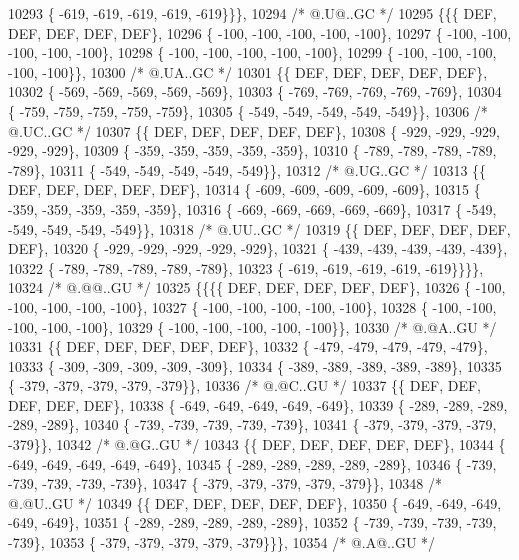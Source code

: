 \begin{DoxyCode}
10293 \{ -619, -619, -619, -619, -619\}\}\},
10294 \textcolor{comment}{/*  @.U@..GC */}
10295 \{\{\{  DEF,  DEF,  DEF,  DEF,  DEF\},
10296 \{ -100, -100, -100, -100, -100\},
10297 \{ -100, -100, -100, -100, -100\},
10298 \{ -100, -100, -100, -100, -100\},
10299 \{ -100, -100, -100, -100, -100\}\},
10300 \textcolor{comment}{/*  @.UA..GC */}
10301 \{\{  DEF,  DEF,  DEF,  DEF,  DEF\},
10302 \{ -569, -569, -569, -569, -569\},
10303 \{ -769, -769, -769, -769, -769\},
10304 \{ -759, -759, -759, -759, -759\},
10305 \{ -549, -549, -549, -549, -549\}\},
10306 \textcolor{comment}{/*  @.UC..GC */}
10307 \{\{  DEF,  DEF,  DEF,  DEF,  DEF\},
10308 \{ -929, -929, -929, -929, -929\},
10309 \{ -359, -359, -359, -359, -359\},
10310 \{ -789, -789, -789, -789, -789\},
10311 \{ -549, -549, -549, -549, -549\}\},
10312 \textcolor{comment}{/*  @.UG..GC */}
10313 \{\{  DEF,  DEF,  DEF,  DEF,  DEF\},
10314 \{ -609, -609, -609, -609, -609\},
10315 \{ -359, -359, -359, -359, -359\},
10316 \{ -669, -669, -669, -669, -669\},
10317 \{ -549, -549, -549, -549, -549\}\},
10318 \textcolor{comment}{/*  @.UU..GC */}
10319 \{\{  DEF,  DEF,  DEF,  DEF,  DEF\},
10320 \{ -929, -929, -929, -929, -929\},
10321 \{ -439, -439, -439, -439, -439\},
10322 \{ -789, -789, -789, -789, -789\},
10323 \{ -619, -619, -619, -619, -619\}\}\}\},
10324 \textcolor{comment}{/*  @.@@..GU */}
10325 \{\{\{\{  DEF,  DEF,  DEF,  DEF,  DEF\},
10326 \{ -100, -100, -100, -100, -100\},
10327 \{ -100, -100, -100, -100, -100\},
10328 \{ -100, -100, -100, -100, -100\},
10329 \{ -100, -100, -100, -100, -100\}\},
10330 \textcolor{comment}{/*  @.@A..GU */}
10331 \{\{  DEF,  DEF,  DEF,  DEF,  DEF\},
10332 \{ -479, -479, -479, -479, -479\},
10333 \{ -309, -309, -309, -309, -309\},
10334 \{ -389, -389, -389, -389, -389\},
10335 \{ -379, -379, -379, -379, -379\}\},
10336 \textcolor{comment}{/*  @.@C..GU */}
10337 \{\{  DEF,  DEF,  DEF,  DEF,  DEF\},
10338 \{ -649, -649, -649, -649, -649\},
10339 \{ -289, -289, -289, -289, -289\},
10340 \{ -739, -739, -739, -739, -739\},
10341 \{ -379, -379, -379, -379, -379\}\},
10342 \textcolor{comment}{/*  @.@G..GU */}
10343 \{\{  DEF,  DEF,  DEF,  DEF,  DEF\},
10344 \{ -649, -649, -649, -649, -649\},
10345 \{ -289, -289, -289, -289, -289\},
10346 \{ -739, -739, -739, -739, -739\},
10347 \{ -379, -379, -379, -379, -379\}\},
10348 \textcolor{comment}{/*  @.@U..GU */}
10349 \{\{  DEF,  DEF,  DEF,  DEF,  DEF\},
10350 \{ -649, -649, -649, -649, -649\},
10351 \{ -289, -289, -289, -289, -289\},
10352 \{ -739, -739, -739, -739, -739\},
10353 \{ -379, -379, -379, -379, -379\}\}\},
10354 \textcolor{comment}{/*  @.A@..GU */}

\end{DoxyCode}
